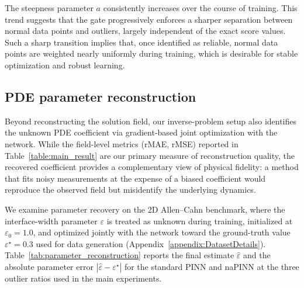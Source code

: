 \documentclass{article}
\theoremstyle{plain}
\theoremstyle{definition}
\theoremstyle{remark}
\begin{document}
The steepness parameter $a$ consistently increases over the course of training. This trend suggests that the gate progressively enforces a sharper separation between normal data points and outliers, largely independent of the exact score values. Such a sharp transition implies that, once identified as reliable, normal data points are weighted nearly uniformly during training, which is desirable for stable optimization and robust learning.

\subsection{PDE parameter reconstruction}
\label{appendix:parameter_reconstruction}

Beyond reconstructing the solution field, our inverse-problem setup also identifies the unknown PDE coefficient via gradient-based joint optimization with the network. While the field-level metrics (rMAE, rMSE) reported in Table~\ref{table:main_result} are our primary measure of reconstruction quality, the recovered coefficient provides a complementary view of physical fidelity: a method that fits noisy measurements at the expense of a biased coefficient would reproduce the observed field but misidentify the underlying dynamics.

We examine parameter recovery on the 2D Allen--Cahn benchmark, where the interface-width parameter $\varepsilon$ is treated as unknown during training, initialized at $\varepsilon_{0}=1.0$, and optimized jointly with the network toward the ground-truth value $\varepsilon^{\star}=0.3$ used for data generation (Appendix~\ref{appendix:DatasetDetails}). Table~\ref{tab:parameter_reconstruction} reports the final estimate $\hat{\varepsilon}$ and the absolute parameter error $|\hat{\varepsilon}-\varepsilon^{\star}|$ for the standard PINN and naPINN at the three outlier ratios used in the main experiments.
\end{document}
